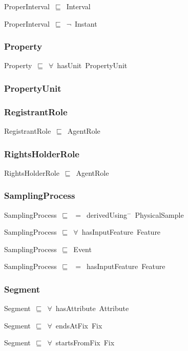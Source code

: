 \documentclass{article}
\begin{document}
ProperInterval~\ensuremath{\sqsubseteq}~Interval~

ProperInterval~\ensuremath{\sqsubseteq}~\ensuremath{\lnot}~Instant

\subsubsection*{Property}

Property~\ensuremath{\sqsubseteq}~\ensuremath{\forall}~hasUnit~PropertyUnit~

\subsubsection*{PropertyUnit}

\subsubsection*{RegistrantRole}

RegistrantRole~\ensuremath{\sqsubseteq}~AgentRole~

\subsubsection*{RightsHolderRole}

RightsHolderRole~\ensuremath{\sqsubseteq}~AgentRole~

\subsubsection*{SamplingProcess}

SamplingProcess~\ensuremath{\sqsubseteq}~\ensuremath{=}~derivedUsing\ensuremath{^-}~PhysicalSample~

SamplingProcess~\ensuremath{\sqsubseteq}~\ensuremath{\forall}~hasInputFeature~Feature~

SamplingProcess~\ensuremath{\sqsubseteq}~Event~

SamplingProcess~\ensuremath{\sqsubseteq}~\ensuremath{=}~hasInputFeature~Feature~

\subsubsection*{Segment}

Segment~\ensuremath{\sqsubseteq}~\ensuremath{\forall}~hasAttribute~Attribute~

Segment~\ensuremath{\sqsubseteq}~\ensuremath{\forall}~endsAtFix~Fix~

Segment~\ensuremath{\sqsubseteq}~\ensuremath{\forall}~startsFromFix~Fix~
\end{document}
